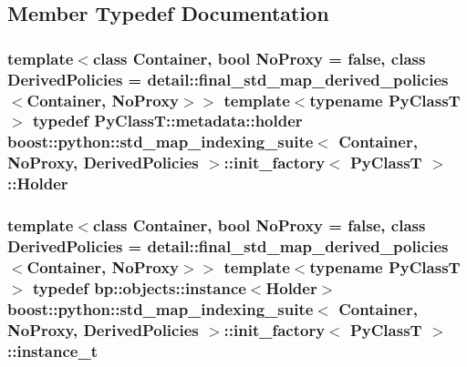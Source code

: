 \subsection{Member Typedef Documentation}
\hypertarget{structboost_1_1python_1_1std__map__indexing__suite_1_1init__factory_a785b4c017210dd048b47eb6c04a5cdc6}{}
\subsubsection[{Holder}]{\setlength{\rightskip}{0pt plus 5cm}template$<$class Container, bool No\+Proxy = false, class Derived\+Policies = detail\+::final\+\_\+std\+\_\+map\+\_\+derived\+\_\+policies$<$\+Container, No\+Proxy$>$$>$ template$<$typename Py\+Class\+T $>$ typedef Py\+Class\+T\+::metadata\+::holder {\bf boost\+::python\+::std\+\_\+map\+\_\+indexing\+\_\+suite}$<$ Container, No\+Proxy, Derived\+Policies $>$\+::{\bf init\+\_\+factory}$<$ Py\+Class\+T $>$\+::{\bf Holder}}\label{structboost_1_1python_1_1std__map__indexing__suite_1_1init__factory_a785b4c017210dd048b47eb6c04a5cdc6}
\hypertarget{structboost_1_1python_1_1std__map__indexing__suite_1_1init__factory_aea2971d45c2f4de6ac83494b504d9a19}{}
\subsubsection[{instance\+\_\+t}]{\setlength{\rightskip}{0pt plus 5cm}template$<$class Container, bool No\+Proxy = false, class Derived\+Policies = detail\+::final\+\_\+std\+\_\+map\+\_\+derived\+\_\+policies$<$\+Container, No\+Proxy$>$$>$ template$<$typename Py\+Class\+T $>$ typedef bp\+::objects\+::instance$<${\bf Holder}$>$ {\bf boost\+::python\+::std\+\_\+map\+\_\+indexing\+\_\+suite}$<$ Container, No\+Proxy, Derived\+Policies $>$\+::{\bf init\+\_\+factory}$<$ Py\+Class\+T $>$\+::{\bf instance\+\_\+t}}\label{structboost_1_1python_1_1std__map__indexing__suite_1_1init__factory_aea2971d45c2f4de6ac83494b504d9a19}


